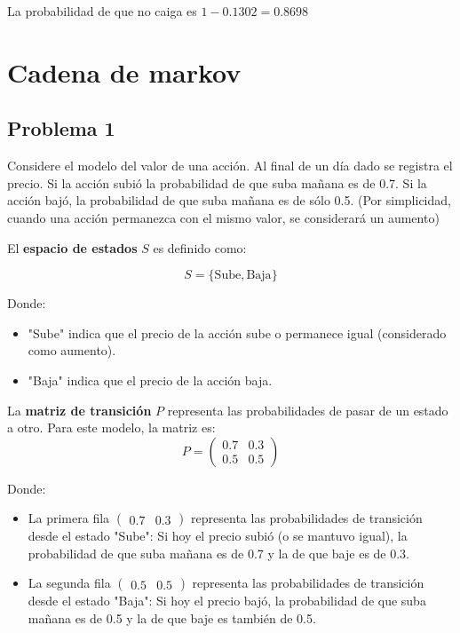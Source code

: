 \documentclass{article}
\begin{document}
La probabilidad de que no caiga es $1-0.1302 = 0.8698$

\section{Cadena de markov}

\subsection{Problema 1}

Considere el modelo del valor de una acción. Al final de un día dado se registra el precio. Si la acción subió la probabilidad de que suba mañana es de 0.7. Si la acción bajó, la probabilidad de que suba mañana es de sólo 0.5. (Por simplicidad, cuando una acción permanezca con el mismo valor, se considerará un aumento)

El \textbf{espacio de estados} \( S \) es definido como:

\[ S = \{ \text{Sube}, \text{Baja} \} \]

Donde:
\begin{itemize}
    \item "Sube" indica que el precio de la acción sube o permanece igual (considerado como aumento).
    \item "Baja" indica que el precio de la acción baja.
\end{itemize}

La \textbf{matriz de transición} \( P \) representa las probabilidades de pasar de un estado a otro. Para este modelo, la matriz es:
\[ P = \begin{pmatrix} 0.7 & 0.3 \\ 0.5 & 0.5 \end{pmatrix} \]

Donde:
\begin{itemize}
    \item La primera fila \( \begin{pmatrix} 0.7 & 0.3 \end{pmatrix} \) representa las probabilidades de transición desde el estado "Sube": Si hoy el precio subió (o se mantuvo igual), la probabilidad de que suba mañana es de 0.7 y la de que baje es de 0.3.
    \item La segunda fila \( \begin{pmatrix} 0.5 & 0.5 \end{pmatrix} \) representa las probabilidades de transición desde el estado "Baja": Si hoy el precio bajó, la probabilidad de que suba mañana es de 0.5 y la de que baje es también de 0.5.
\end{itemize}
\end{document}

